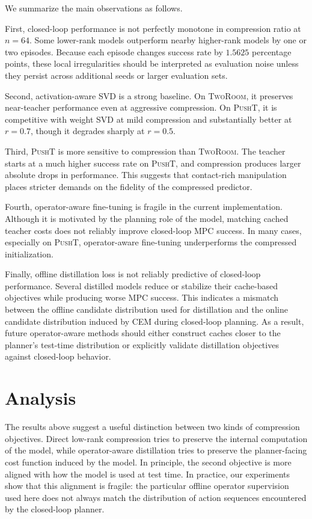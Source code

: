 \documentclass[11pt]{article}
\begin{document}
We summarize the main observations as follows.

First, closed-loop performance is not perfectly monotone in compression ratio at \(n=64\). Some lower-rank models outperform nearby higher-rank models by one or two episodes. Because each episode changes success rate by \(1.5625\) percentage points, these local irregularities should be interpreted as evaluation noise unless they persist across additional seeds or larger evaluation sets.

Second, activation-aware SVD is a strong baseline. On \textsc{TwoRoom}, it preserves near-teacher performance even at aggressive compression. On \textsc{PushT}, it is competitive with weight SVD at mild compression and substantially better at \(r=0.7\), though it degrades sharply at \(r=0.5\).

Third, \textsc{PushT} is more sensitive to compression than \textsc{TwoRoom}. The teacher starts at a much higher success rate on \textsc{PushT}, and compression produces larger absolute drops in performance. This suggests that contact-rich manipulation places stricter demands on the fidelity of the compressed predictor.

Fourth, operator-aware fine-tuning is fragile in the current implementation. Although it is motivated by the planning role of the model, matching cached teacher costs does not reliably improve closed-loop MPC success. In many cases, especially on \textsc{PushT}, operator-aware fine-tuning underperforms the compressed initialization.

Finally, offline distillation loss is not reliably predictive of closed-loop performance. Several distilled models reduce or stabilize their cache-based objectives while producing worse MPC success. This indicates a mismatch between the offline candidate distribution used for distillation and the online candidate distribution induced by CEM during closed-loop planning. As a result, future operator-aware methods should either construct caches closer to the planner's test-time distribution or explicitly validate distillation objectives against closed-loop behavior.
\section{Analysis}
\label{sec:analysis}

The results above suggest a useful distinction between two kinds of compression objectives. Direct low-rank compression tries to preserve the internal computation of the model, while operator-aware distillation tries to preserve the planner-facing cost function induced by the model. In principle, the second objective is more aligned with how the model is used at test time. In practice, our experiments show that this alignment is fragile: the particular offline operator supervision used here does not always match the distribution of action sequences encountered by the closed-loop planner.
\end{document}
